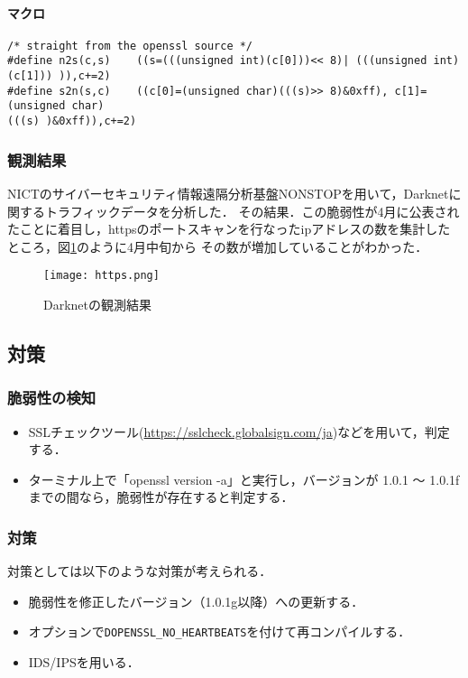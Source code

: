 \paragraph{マクロ}
\begin{verbatim}
/* straight from the openssl source */
#define n2s(c,s)    ((s=(((unsigned int)(c[0]))<< 8)| (((unsigned int)(c[1])) )),c+=2)
#define s2n(s,c)    ((c[0]=(unsigned char)(((s)>> 8)&0xff), c[1]=(unsigned char)
(((s) )&0xff)),c+=2)
\end{verbatim}

\subsubsection{観測結果}
NICTのサイバーセキュリティ情報遠隔分析基盤NONSTOPを用いて，Darknetに関するトラフィックデータを分析した．
その結果．この脆弱性が4月に公表されたことに着目し，httpsのポートスキャンを行なったipアドレスの数を集計したところ，図\ref{fig:https}のように4月中旬から
その数が増加していることがわかった．

\begin{figure}[htbp]
  \centering
    \texttt{[image: https.png]}
    \caption{Darknetの観測結果}
  \label{fig:https}
\end{figure}


\subsection{対策}
\subsubsection{脆弱性の検知}
\begin{itemize}
\item SSLチェックツール(\url{https://sslcheck.globalsign.com/ja})\cite{check}などを用いて，判定する．
\item ターミナル上で「openssl version -a」と実行し，バージョンが 1.0.1 〜 1.0.1fまでの間なら，脆弱性が存在すると判定する．
\end{itemize}


\subsubsection{対策}
対策としては以下のような対策が考えられる．
\begin{itemize}
\item 脆弱性を修正したバージョン（1.0.1g以降）への更新する．
\item オプションで\verb|DOPENSSL_NO_HEARTBEATS|を付けて再コンパイルする．
\item IDS/IPSを用いる．
\end{itemize}
